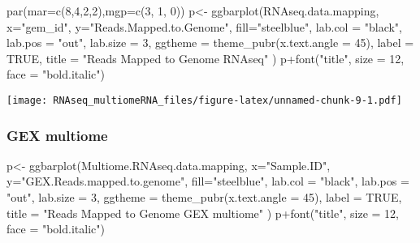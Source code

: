 \documentclass[
]{article}
\newenvironment{Shaded}{\begin{snugshade}}{\end{snugshade}}
\newcommand{\AttributeTok}[1]{\textcolor[rgb]{0.77,0.63,0.00}{#1}}
\newcommand{\ConstantTok}[1]{\textcolor[rgb]{0.00,0.00,0.00}{#1}}
\newcommand{\DecValTok}[1]{\textcolor[rgb]{0.00,0.00,0.81}{#1}}
\newcommand{\FunctionTok}[1]{\textcolor[rgb]{0.00,0.00,0.00}{#1}}
\newcommand{\NormalTok}[1]{#1}
\newcommand{\OtherTok}[1]{\textcolor[rgb]{0.56,0.35,0.01}{#1}}
\newcommand{\SpecialCharTok}[1]{\textcolor[rgb]{0.00,0.00,0.00}{#1}}
\newcommand{\StringTok}[1]{\textcolor[rgb]{0.31,0.60,0.02}{#1}}
\begin{document}
\begin{Shaded}
\begin{Highlighting}[]
\FunctionTok{par}\NormalTok{(}\AttributeTok{mar=}\FunctionTok{c}\NormalTok{(}\DecValTok{8}\NormalTok{,}\DecValTok{4}\NormalTok{,}\DecValTok{2}\NormalTok{,}\DecValTok{2}\NormalTok{),}\AttributeTok{mgp=}\FunctionTok{c}\NormalTok{(}\DecValTok{3}\NormalTok{, }\DecValTok{1}\NormalTok{, }\DecValTok{0}\NormalTok{))}
\NormalTok{p}\OtherTok{\textless{}{-}} \FunctionTok{ggbarplot}\NormalTok{(RNAseq.data.mapping, }
          \AttributeTok{x=}\StringTok{"gem\_id"}\NormalTok{,}
           \AttributeTok{y=}\StringTok{"Reads.Mapped.to.Genome"}\NormalTok{,}
          \AttributeTok{fill=}\StringTok{"steelblue"}\NormalTok{,}
          \AttributeTok{lab.col =} \StringTok{"black"}\NormalTok{, }
          \AttributeTok{lab.pos =} \StringTok{"out"}\NormalTok{,}
          \AttributeTok{lab.size =} \DecValTok{3}\NormalTok{,}
          \AttributeTok{ggtheme =} \FunctionTok{theme\_pubr}\NormalTok{(}\AttributeTok{x.text.angle =} \DecValTok{45}\NormalTok{),}
          \AttributeTok{label =} \ConstantTok{TRUE}\NormalTok{,}
          \AttributeTok{title =} \StringTok{"Reads Mapped to Genome RNAseq"}
\NormalTok{          )}
\NormalTok{p}\SpecialCharTok{+}\FunctionTok{font}\NormalTok{(}\StringTok{"title"}\NormalTok{, }\AttributeTok{size =} \DecValTok{12}\NormalTok{, }\AttributeTok{face =} \StringTok{"bold.italic"}\NormalTok{)}
\end{Highlighting}
\end{Shaded}

\texttt{[image: RNAseq\_multiomeRNA\_files/figure-latex/unnamed-chunk-9-1.pdf]}

\hypertarget{gex-multiome}{%
\subsubsection{GEX multiome}\label{gex-multiome}}

\begin{Shaded}
\begin{Highlighting}[]
\NormalTok{p}\OtherTok{\textless{}{-}} \FunctionTok{ggbarplot}\NormalTok{(Multiome.RNAseq.data.mapping, }
          \AttributeTok{x=}\StringTok{"Sample.ID"}\NormalTok{,}
           \AttributeTok{y=}\StringTok{"GEX.Reads.mapped.to.genome"}\NormalTok{,}
          \AttributeTok{fill=}\StringTok{"steelblue"}\NormalTok{,}
          \AttributeTok{lab.col =} \StringTok{"black"}\NormalTok{, }
          \AttributeTok{lab.pos =} \StringTok{"out"}\NormalTok{,}
          \AttributeTok{lab.size =} \DecValTok{3}\NormalTok{,}
          \AttributeTok{ggtheme =} \FunctionTok{theme\_pubr}\NormalTok{(}\AttributeTok{x.text.angle =} \DecValTok{45}\NormalTok{),}
          \AttributeTok{label =} \ConstantTok{TRUE}\NormalTok{,}
          \AttributeTok{title =} \StringTok{"Reads Mapped to Genome GEX multiome"}
\NormalTok{          )}
\NormalTok{p}\SpecialCharTok{+}\FunctionTok{font}\NormalTok{(}\StringTok{"title"}\NormalTok{, }\AttributeTok{size =} \DecValTok{12}\NormalTok{, }\AttributeTok{face =} \StringTok{"bold.italic"}\NormalTok{)}
\end{Highlighting}
\end{Shaded}
\end{document}
